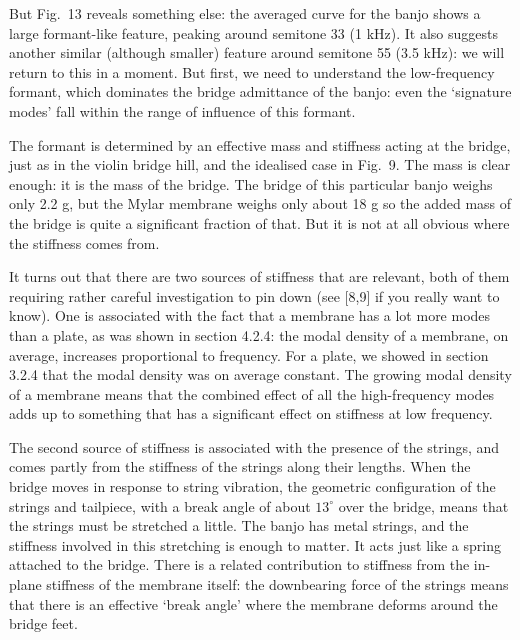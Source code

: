   But Fig.\ 13 reveals something else: the averaged curve for the banjo shows a 
  large formant-like feature, peaking around semitone 33 (1 kHz). It also 
  suggests another similar (although smaller) feature around semitone 55 (3.5 
  kHz): we will return to this in a moment. But first, we need to understand 
  the low-frequency formant, which dominates the bridge admittance of the 
  banjo: even the `signature modes' fall within the range of influence of this 
  formant. 

  The formant is determined by an effective mass and stiffness acting at the 
  bridge, just as in the violin bridge hill, and the idealised case in Fig.\ 9. 
  The mass is clear enough: it is the mass of the bridge. The bridge of this 
  particular banjo weighs only 2.2 g, but the Mylar membrane weighs only about 
  18 g so the added mass of the bridge is quite a significant fraction of that. 
  But it is not at all obvious where the stiffness comes from. 

  It turns out that there are two sources of stiffness that are relevant, both 
  of them requiring rather careful investigation to pin down (see [8,9] if you 
  really want to know). One is associated with the fact that a membrane has a 
  lot more modes than a plate, as was shown in section 4.2.4: the modal density 
  of a membrane, on average, increases proportional to frequency. For a plate, 
  we showed in section 3.2.4 that the modal density was on average constant. 
  The growing modal density of a membrane means that the combined effect of all 
  the high-frequency modes adds up to something that has a significant effect 
  on stiffness at low frequency. 

  The second source of stiffness is associated with the presence of the 
  strings, and comes partly from the stiffness of the strings along their 
  lengths. When the bridge moves in response to string vibration, the geometric 
  configuration of the strings and tailpiece, with a break angle of about 
  $13^\circ$ over the bridge, means that the strings must be stretched a 
  little. The banjo has metal strings, and the stiffness involved in this 
  stretching is enough to matter. It acts just like a spring attached to the 
  bridge. There is a related contribution to stiffness from the in-plane 
  stiffness of the membrane itself: the downbearing force of the strings means 
  that there is an effective `break angle' where the membrane deforms around 
  the bridge feet. 


